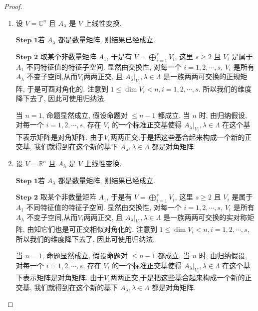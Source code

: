 \documentclass[../../main.tex]{subfiles}%
\begin{document}
\begin{proof}
\begin{enumerate}
\item 设 \(V = \mathbb{C}^n\) 且 \(A_{\lambda}\) 是 \(V\) 上线性变换.

$\mathbf{Step}\,\,\mathbf{1}$若 \(A_{\lambda}\) 都是数量矩阵, 则结果已经成立.

$\mathbf{Step}\,\,\mathbf{2}$ 取某个非数量矩阵 \(A_1\), 于是有 \(V = \bigoplus_{i=1}^s V_i\), 这里 \(s \geqslant 2\) 且 \(V_i\) 是属于 \(A_1\) 不同特征值的特征子空间. 显然由交换性, 对每一个 \(i = 1, 2, \cdots, s\), \(V_i\) 是所有 \(A_{\lambda}\) 不变子空间,从而$V_i$两两正交, 且 \(A_{\lambda}|_{V_i}, \lambda \in \Lambda\) 是一族两两可交换的正规矩阵, 于是可酉对角化的. 注意到 \(1 \leqslant \dim V_i < n, i = 1, 2, \cdots, s\). 所以我们的维度降下去了, 因此可使用归纳法.

当 \(n = 1\), 命题显然成立, 假设命题对 \(\leqslant n - 1\) 都成立, 当 \(n\) 时, 由归纳假设, 对每一个 \(i = 1, 2, \cdots, s\), 存在 \(V_i\) 的一个标准正交基使得 \(A_{\lambda}|_{V_i}, \lambda \in \Lambda\) 在这个基下表示矩阵是对角矩阵. 由于$V_i$两两正交,于是把这些基合起来构成一个新的正交基, 我们就得到在这个新的基下 \(A_{\lambda}, \lambda \in \Lambda\) 都是对角矩阵.

\item 设 \(V = \mathbb{R}^n\) 且 \(A_{\lambda}\) 是 \(V\) 上线性变换.

$\mathbf{Step}\,\,\mathbf{1}$若 \(A_{\lambda}\) 都是数量矩阵, 则结果已经成立.

$\mathbf{Step}\,\,\mathbf{2}$ 取某个非数量矩阵 \(A_1\), 于是有 \(V = \bigoplus_{i=1}^s V_i\), 这里 \(s \geqslant 2\) 且 \(V_i\) 是属于 \(A_1\) 不同特征值的特征子空间. 显然由交换性, 对每一个 \(i = 1, 2, \cdots, s\), \(V_i\) 是所有 \(A_{\lambda}\) 不变子空间,从而$V_i$两两正交, 且 \(A_{\lambda}|_{V_i}, \lambda \in \Lambda\) 是一族两两可交换的实对称矩阵, 由知它们也是可正交相似对角化的. 注意到 \(1 \leqslant \dim V_i < n, i = 1, 2, \cdots, s\), 所以我们的维度降下去了, 因此可使用归纳法.

当 \(n = 1\), 命题显然成立, 假设命题对 \(\leqslant n - 1\) 都成立, 当 \(n\) 时, 由归纳假设, 对每一个 \(i = 1, 2, \cdots, s\), 存在 \(V_i\) 的一个标准正交基使得 \(A_{\lambda}|_{V_i}, \lambda \in \Lambda\) 在这个基下表示矩阵是对角矩阵. 由于$V_i$两两正交,于是把这些基合起来构成一个新的正交基, 我们就得到在这个新的基下 \(A_{\lambda}, \lambda \in \Lambda\) 都是对角矩阵.
\end{enumerate}
\end{proof}
\end{document}
